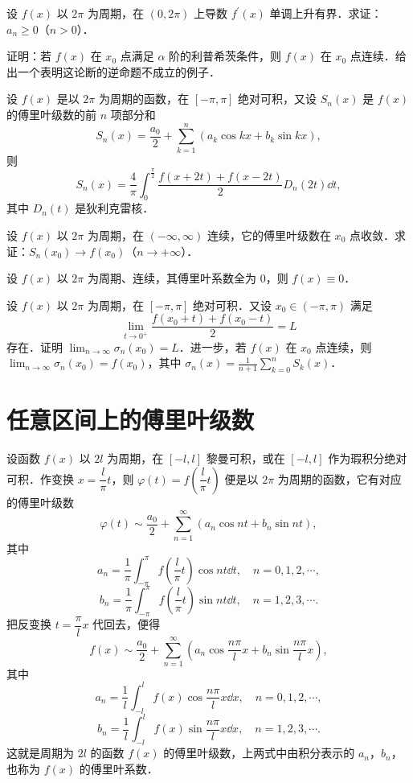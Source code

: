 \begin{xiti}
\item 设 $f(x)$ 以 $2\pi$ 为周期，在 $(0,2\pi)$ 上导数 $f^{\prime}(x)$ 单调上升有界．求证：$a_{n}\geqslant 0$（$n>0$）．
\item 证明：若 $f(x)$ 在 $x_{0}$ 点满足 $\alpha$ 阶的利普希茨条件，则 $f(x)$ 在 $x_{0}$ 点连续．给出一个表明这论断的逆命题不成立的例子．
\item 设 $f(x)$ 是以 $2\pi$ 为周期的函数，在 $[-\pi,\pi]$ 绝对可积，又设 $S_{n}(x)$ 是 $f(x)$ 的傅里叶级数的前 $n$ 项部分和
\[
S_{n}(x)=\frac{a_{0}}{2}+\sum_{k=1}^{n}\left(a_{k}\cos kx+b_{k}\sin kx\right),
\]
则
\[
S_{n}(x)=\frac{4}{\pi}\int_{0}^{\frac{\pi}{2}}\frac{f(x+2t)+f(x-2t)}{2}D_{n}(2t)\dd t,
\]
其中 $D_{n}(t)$ 是狄利克雷核．
\item 设 $f(x)$ 以 $2\pi$ 为周期，在 $(-\infty,\infty)$ 连续，它的傅里叶级数在 $x_{0}$ 点收敛．求证：$S_{n}(x_{0})\to f(x_{0})$（$n\to+\infty$）．
\item 设 $f(x)$ 以 $2\pi$ 为周期、连续，其傅里叶系数全为 $0$，则 $f(x)\equiv 0$．
\item 设 $f(x)$ 以 $2\pi$ 为周期，在 $[-\pi,\pi]$ 绝对可积．又设 $x_{0}\in(-\pi,\pi)$ 满足
\[
\lim_{t\to 0^{+}}\frac{f(x_{0}+t)+f(x_{0}-t)}{2}=L
\]
存在．证明 $\displaystyle\lim_{n\to\infty}\sigma_{n}(x_{0})=L$．进一步，若 $f(x)$ 在 $x_{0}$ 点连续，则 $\displaystyle\lim_{n\to\infty}\sigma_{n}(x_{0})=f(x_{0})$，其中 $\displaystyle\sigma_{n}(x)=\frac{1}{n+1}\sum_{k=0}^{n}S_{k}(x)$．
\end{xiti}

\section{任意区间上的傅里叶级数}

设函数 $f(x)$ 以 $2l$ 为周期，在 $[-l,l]$ 黎曼可积，或在 $[-l,l]$ 作为瑕积分绝对可积．作变换 $x=\dfrac{l}{\pi}t$，则 $\varphi(t)=f\left(\dfrac{l}{\pi}t\right)$ 便是以 $2\pi$ 为周期的函数，它有对应的傅里叶级数
\[
\varphi(t)\sim\frac{a_{0}}{2}+\sum_{n=1}^{\infty}\left(a_{n}\cos nt+b_{n}\sin nt\right),
\]
其中
\[
a_{n}=\frac{1}{\pi}\int_{-\pi}^{\pi}f\left(\frac{l}{\pi}t\right)\cos nt\dd t,\quad n=0,1,2,\cdots,
\]
\[
b_{n}=\frac{1}{\pi}\int_{-\pi}^{\pi}f\left(\frac{l}{\pi}t\right)\sin nt\dd t,\quad n=1,2,3,\cdots.
\]
把反变换 $t=\dfrac{\pi}{l}x$ 代回去，便得
\begin{equation}
f(x)\sim\frac{a_{0}}{2}+\sum_{n=1}^{\infty}\left(a_{n}\cos\frac{n\pi}{l}x+b_{n}\sin\frac{n\pi}{l}x\right),
\tag{1}
\end{equation}
其中
\begin{equation}
a_{n}=\frac{1}{l}\int_{-l}^{l}f(x)\cos\frac{n\pi}{l}x\dd x,\quad n=0,1,2,\cdots,
\tag{2}
\end{equation}
\begin{equation}
b_{n}=\frac{1}{l}\int_{-l}^{l}f(x)\sin\frac{n\pi}{l}x\dd x,\quad n=1,2,3,\cdots.
\tag{3}
\end{equation}
这就是周期为 $2l$ 的函数 $f(x)$ 的傅里叶级数，上两式中由积分表示的 $a_{n}$，$b_{n}$，也称为 $f(x)$ 的傅里叶系数．


